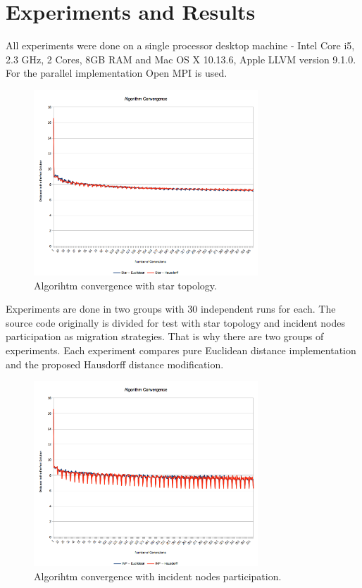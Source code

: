 \documentclass[runningheads]{llncs}
\begin{document}
\section{Experiments and Results}

All experiments were done on a single processor desktop machine - Intel Core i5, 2.3 GHz, 2 Cores, 8GB RAM and Mac OS X 10.13.6, Apple LLVM version 9.1.0. For the parallel implementation Open MPI is used.

\begin{figure}
\includegraphics[width=0.75\textwidth]{fig03.png}
\centering
\caption{Algorihtm convergence with star topology.} \label{fig03}
\end{figure}
\FloatBarrier

Experiments are done in two groups with 30 independent runs for each. The source code originally is divided for test with star topology and incident nodes participation as migration strategies. That is why there are two groups of experiments. Each experiment compares pure Euclidean distance implementation and the proposed Hausdorff distance modification. 

\begin{figure}
\includegraphics[width=0.75\textwidth]{fig04.png}
\centering
\caption{Algorihtm convergence with incident nodes participation.} \label{fig04}
\end{figure}
\FloatBarrier
\end{document}

